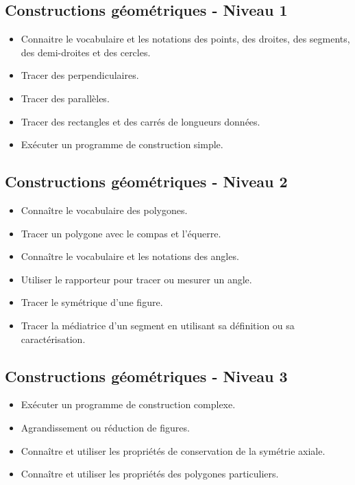 \documentclass[a4paper,12pt,fleqn]{article}		
\begin{document}
\renewcommand{\labelitemi}{}

\subsection*{Constructions géométriques - Niveau 1}

\begin{itemize}
	\item {}Connaitre le vocabulaire et les notations des points, des droites, des segments, des demi-droites et des cercles. 
	\item {}Tracer des perpendiculaires.
	\item {}Tracer des parallèles.
	\item {}Tracer des rectangles et des carrés de longueurs données.
	\item {}Exécuter un programme de construction simple.
\end{itemize}

\subsection*{Constructions géométriques - Niveau 2}

\begin{itemize}
	\item {}Connaître le vocabulaire des polygones.
	\item {}Tracer un polygone avec le compas et l’équerre.
	\item {}Connaître le vocabulaire et les notations des angles.
	\item {}Utiliser le rapporteur pour tracer ou mesurer un angle.
	\item {}Tracer le symétrique d’une figure.
	\item {}Tracer la médiatrice d’un segment en utilisant sa définition ou sa caractérisation.
\end{itemize}

\subsection*{Constructions géométriques - Niveau 3}

\begin{itemize}
	\item {}Exécuter un programme de construction complexe.
	\item {}Agrandissement ou réduction de figures.
	\item {}Connaître et utiliser les propriétés de conservation de la symétrie axiale.
	\item {}Connaître et utiliser les propriétés des polygones particuliers.
\end{itemize}
\end{document}

